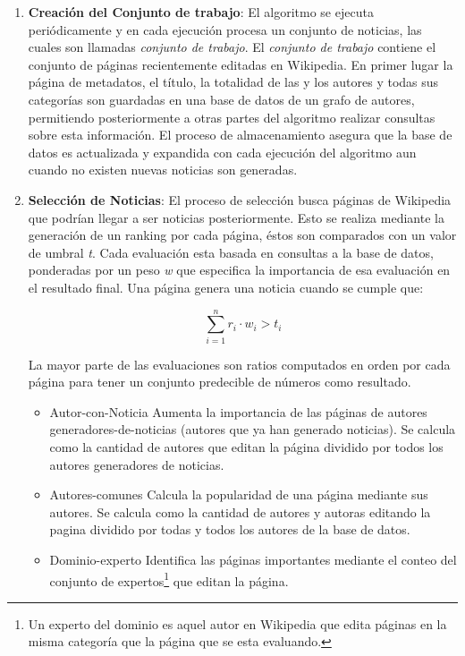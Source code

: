 \begin{enumerate}
	\item \textbf{Creación del Conjunto de trabajo}: El algoritmo se ejecuta periódicamente y en cada ejecución procesa un conjunto de noticias, las cuales son llamadas \emph{conjunto de trabajo}. El \emph{conjunto de trabajo} contiene el conjunto de páginas recientemente editadas en Wikipedia. 
	En primer lugar la página de metadatos, el título, la totalidad de las y los autores y todas sus categorías son guardadas en una base de datos de un grafo de autores, permitiendo posteriormente a otras partes del algoritmo realizar consultas sobre esta información.
	El proceso de almacenamiento asegura que la base de datos es actualizada y expandida con cada ejecución del algoritmo aun cuando no existen nuevas noticias son generadas.	
	
	\item \textbf{Selección de Noticias}: El proceso de selección busca páginas de Wikipedia que podrían llegar a ser noticias posteriormente. Esto se realiza mediante la generación de un ranking por cada página, éstos son comparados con un valor de umbral \emph{t}. Cada evaluación esta basada en consultas a la base de datos, ponderadas por un peso \emph{w} que especifica la importancia de esa evaluación en el resultado final. Una página genera una noticia cuando se cumple que:
	
	\begin{equation*}
	\sum_{i=1}^{n} {r_i \cdot w_i} > t_i
	\end{equation*}  
	
    La mayor parte de las evaluaciones son ratios computados en orden por cada página  para tener un conjunto predecible de números como resultado.
	\begin{itemize}
		\item Autor-con-Noticia
		Aumenta la importancia de las páginas de autores generadores-de-noticias (autores que ya han generado noticias). Se calcula como la cantidad de autores que editan la página dividido por todos los autores generadores de noticias.
		
		\item Autores-comunes
		Calcula la popularidad de una página mediante sus autores. Se calcula como la cantidad de autores y autoras editando la pagina dividido por todas y todos los autores de la base de datos.
		
		\item Dominio-experto
		Identifica las páginas importantes mediante el conteo del conjunto de expertos\footnote{ Un experto del dominio es aquel autor en Wikipedia que edita páginas en la misma categoría que la página que se esta evaluando.} que editan la página.
		

\end{itemize}
\end{enumerate}
